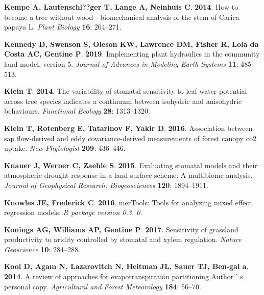 \documentclass[11pt,twoside]{reedthesis}
\begin{document}
\hypertarget{ref-Kempe2014}{}
\textbf{\textnormal{Kempe A}, \textnormal{Lautenschl??ger T},
\textnormal{Lange A}, \textnormal{Neinhuis C}}. \textbf{2014}. How to
become a tree without wood - biomechanical analysis of the stem of
Carica papaya L. \emph{Plant Biology} \textbf{16}: 264--271.

\hypertarget{ref-Kennedy2019}{}
\textbf{\textnormal{Kennedy D}, \textnormal{Swenson S},
\textnormal{Oleson KW}, \textnormal{Lawrence DM}, \textnormal{Fisher R},
\textnormal{Lola da Costa AC}, \textnormal{Gentine P}}. \textbf{2019}.
Implementing plant hydraulics in the community land model, version 5.
\emph{Journal of Advances in Modeling Earth Systems} \textbf{11}:
485--513.

\hypertarget{ref-Klein2014}{}
\textbf{\textnormal{Klein T}}. \textbf{2014}. The variability of
stomatal sensitivity to leaf water potential across tree species
indicates a continuum between isohydric and anisohydric behaviours.
\emph{Functional Ecology} \textbf{28}: 1313--1320.

\hypertarget{ref-Klein2016}{}
\textbf{\textnormal{Klein T}, \textnormal{Rotenberg E},
\textnormal{Tatarinov F}, \textnormal{Yakir D}}. \textbf{2016}.
Association between sap flow-derived and eddy covariance-derived
measurements of forest canopy co2 uptake. \emph{New Phytologist}
\textbf{209}: 436--446.

\hypertarget{ref-Knauer2015}{}
\textbf{\textnormal{Knauer J}, \textnormal{Werner C}, \textnormal{Zaehle
S}}. \textbf{2015}. Evaluating stomatal models and their atmospheric
drought response in a land surface scheme: A multibiome analysis.
\emph{Journal of Geophysical Research: Biogeosciences} \textbf{120}:
1894--1911.

\hypertarget{ref-knowles_mertools_2016}{}
\textbf{\textnormal{Knowles JE}, \textnormal{Frederick C}}.
\textbf{2016}. merTools: Tools for analyzing mixed effect regression
models. \emph{R package version 0.3. 0}.

\hypertarget{ref-Konings2017}{}
\textbf{\textnormal{Konings AG}, \textnormal{Williams AP},
\textnormal{Gentine P}}. \textbf{2017}. Sensitivity of grassland
productivity to aridity controlled by stomatal and xylem regulation.
\emph{Nature Geoscience} \textbf{10}: 284--288.

\hypertarget{ref-Kool2014}{}
\textbf{\textnormal{Kool D}, \textnormal{Agam N},
\textnormal{Lazarovitch N}, \textnormal{Heitman JL}, \textnormal{Sauer
TJ}, \textnormal{Ben-gal a}}. \textbf{2014}. A review of approaches for
evapotranspiration partitioning Author ' s personal copy.
\emph{Agricultural and Forest Meteorology} \textbf{184}: 56--70.
\end{document}
